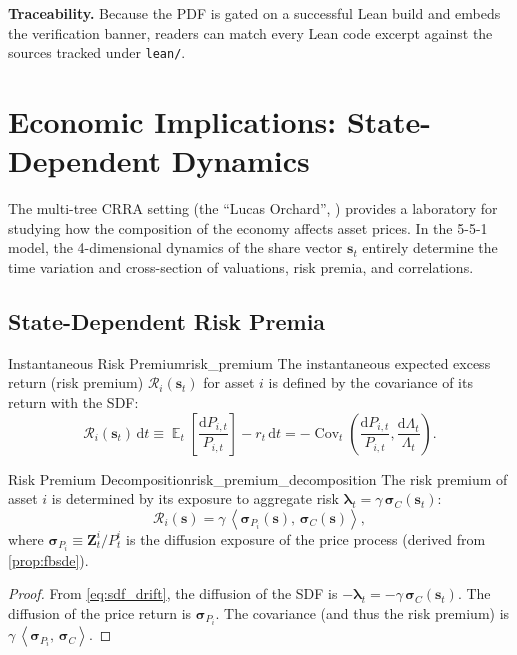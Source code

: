 \documentclass[11pt,letterpaper,oneside]{article}
\numberwithin{equation}{section}
\DeclareMathOperator{\E}{\mathbb{E}}
\DeclareMathOperator{\Cov}{\mathrm{Cov}}
\newcommand{\1}{\mathbf{1}}
\newcommand{\diff}{\mathrm{d}}
\newcommand{\ip}[2]{\left\langle #1,\,#2\right\rangle}
\begin{document}
\begin{tcolorbox}[didacticstyle]
  \textbf{Traceability.} Because the PDF is gated on a successful Lean build and embeds the verification banner, readers can match every Lean code excerpt against the sources tracked under \texttt{lean/}.
\end{tcolorbox}

\section{Economic Implications: State-Dependent Dynamics}\label{sec:economic_remarks}
The multi-tree CRRA setting (the ``Lucas Orchard'', \cite{martin2011}) provides a laboratory for studying how the composition of the economy affects asset prices. In the 5-5-1 model, the 4-dimensional dynamics of the share vector $\bm{s}_t$ entirely determine the time variation and cross-section of valuations, risk premia, and correlations.

\subsection{State-Dependent Risk Premia}

\begin{definition}{Instantaneous Risk Premium}{risk_premium}
The instantaneous expected excess return (risk premium) $\mathcal{R}_i(\bm{s}_t)$ for asset $i$ is defined by the covariance of its return with the SDF:
\[
  \mathcal{R}_i(\bm{s}_t)\,\diff t \equiv \E_t\left[\frac{\diff P_{i,t}}{P_{i,t}}\right] - r_t\,\diff t = -\Cov_t\left(\frac{\diff P_{i,t}}{P_{i,t}}, \frac{\diff \Lambda_t}{\Lambda_t}\right).
\]
\end{definition}

\begin{proposition}{Risk Premium Decomposition}{risk_premium_decomposition}
The risk premium of asset $i$ is determined by its exposure to aggregate risk $\bm{\lambda}_t = \gamma\,\bm{\sigma}_C(\bm{s}_t)$:
\begin{equation}\label{eq:risk_premium_explicit}
  \mathcal{R}_i(\bm{s}) = \gamma\,\ip{\bm{\sigma}_{P_i}(\bm{s})}{\bm{\sigma}_C(\bm{s})},
\end{equation}
where $\bm{\sigma}_{P_i} \equiv \bm{Z}_t^i / P_t^i$ is the diffusion exposure of the price process (derived from \cref{prop:fbsde}).
\end{proposition}
\begin{proof}
From \cref{eq:sdf_drift}, the diffusion of the SDF is $-\bm{\lambda}_t = -\gamma\,\bm{\sigma}_C(\bm{s}_t)$. The diffusion of the price return is $\bm{\sigma}_{P_i}$. The covariance (and thus the risk premium) is $\gamma\,\ip{\bm{\sigma}_{P_i}}{\bm{\sigma}_C}$.
\end{proof}
\end{document}
